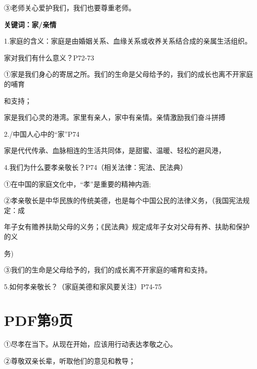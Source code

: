 \documentclass[lang=cn,11pt]{elegantbook}
\newcommand{\daofasym}[1]{{\daofasymbolfont #1}}
\newcommand{\daofasym}[1]{#1}
\begin{document}
\daofasym{③}老师关心爱护我们，我们也要尊重老师。\par

\textbf{关键词：家/亲情}\par

1.家庭的含义：家庭是由婚姻关系、血缘关系或收养关系结合成的亲属生活组织。\par

家对我们有什么意义？P72-73\par

\daofasym{①}家是我们身心的寄居之所。我们的生命是父母给予的，我们的成长也离不开家庭的哺育\par

和支持；\par

家是我们心灵的港湾。家里有亲人，家中有亲情。亲情激励我们奋斗拼搏\par

2./中国人心中的“家”P74\par

家是代代传承、血脉相连的生活共同体，是甜蜜、温暖、轻松的避风港，\par

4.我们为什么要孝亲敬长？P74（相关法律：宪法、民法典）\par

\daofasym{①}在中国的家庭文化中，“孝”是重要的精神内涵;\par

\daofasym{②}孝亲敬长是中华民族的传统美德，也是每个中国公民的法律义务，（我国宪法规定：成\par

年子女有赡养扶助父母的义务；《民法典》规定成年子女对父母有养、扶助和保护的义\par

务)\par

\daofasym{③}我们的生命是父母给予的，我们的成长离不开家庭的哺育和支持。\par

5.如何孝亲敬长？（家庭美德和家风要关注）P74-75\par


\section*{PDF第9页}

\daofasym{①}尽孝在当下。从现在开始，应该用行动表达孝敬之心。\par

\daofasym{②}尊敬双亲长辈，听取他们的意见和教导；\par
\end{document}
